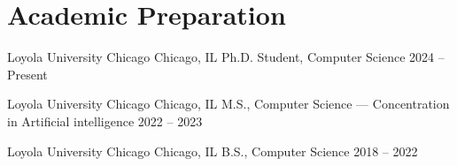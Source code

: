 \section*{Academic Preparation}

\cventry
    {Loyola University Chicago}
    {Chicago, IL}
    {Ph.D. Student, Computer Science}
    {2024 -- Present}

\cventry
    {Loyola University Chicago}
    {Chicago, IL}
    {M.S., Computer Science --- Concentration in Artificial intelligence}
    {2022 -- 2023}

\cventry
    {Loyola University Chicago}
    {Chicago, IL}
    {B.S., Computer Science}
    {2018 -- 2022}